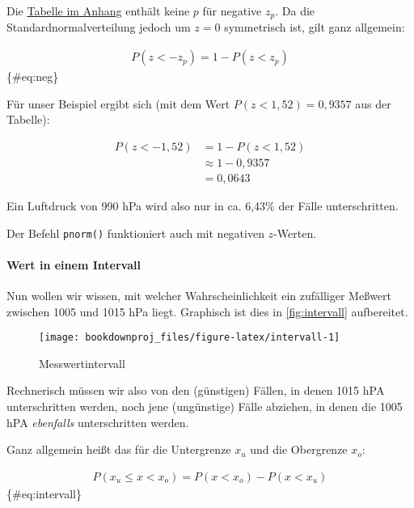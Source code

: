 \documentclass[
  ngerman,
]{article}
\begin{document}
Die \protect\hyperlink{ptab}{Tabelle im Anhang} enthält keine \(p\) für negative \(z_p\). Da die Standardnormalverteilung jedoch um \(z=0\) symmetrisch ist, gilt ganz allgemein:

\[
  \begin{aligned}
    P(z < -z_p) = 1 - P(z < z_p)
  \end{aligned}
\]\{\#eq:neg\}

Für unser Beispiel ergibt sich (mit dem Wert \(P(z < 1,52) = 0,9357\) aus der Tabelle):

\[
  \begin{aligned}
    P(z < -1,52) &= 1 - P(z < 1,52) \\
    &\approx 1-0,9357 \\
    &=0,0643
  \end{aligned}
\]

Ein Luftdruck von 990 hPa wird also nur in ca. 6,43\% der Fälle unterschritten.

\begin{rtip}
Der Befehl {\tt pnorm()} funktioniert auch mit negativen $z$-Werten.
\end{rtip}

\hypertarget{wert-in-einem-intervall}{%
\paragraph{Wert in einem Intervall}\label{wert-in-einem-intervall}}

Nun wollen wir wissen, mit welcher Wahrscheinlichkeit ein zufälliger Meßwert zwischen 1005 und 1015 hPa liegt. Graphisch ist dies in \autoref{fig:intervall} aufbereitet.

\begin{figure}[h]

{\centering \texttt{[image: bookdownproj\_files/figure-latex/intervall-1]} 

}

\caption{Messwertintervall}\label{fig:intervall}
\end{figure}

Rechnerisch müssen wir also von den (günstigen) Fällen, in denen 1015 hPA unterschritten werden, noch jene (ungünstige) Fälle abziehen, in denen die 1005 hPA \emph{ebenfalls} unterschritten werden.

Ganz allgemein heißt das für die Untergrenze \(x_u\) und die Obergrenze \(x_o\):

\[
  \begin{aligned}
    P(x_{u} \leq x < x_{o}) = P(x < x_{o}) - P(x < x_{u})
  \end{aligned}
\]\{\#eq:intervall\}
\end{document}
